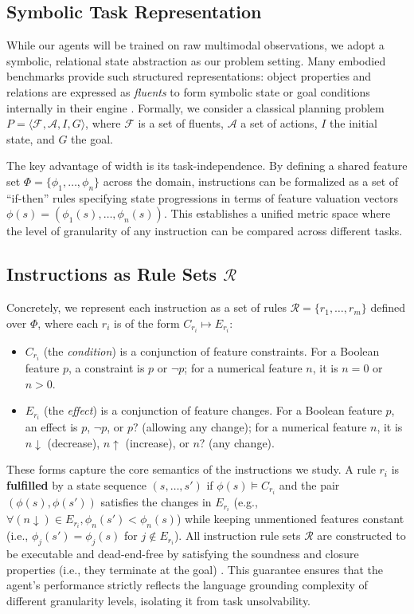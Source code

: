 \documentclass[11pt]{article}
\begin{document}
\subsection{Symbolic Task Representation}

While our agents will be trained on raw multimodal observations, we adopt a symbolic, relational state abstraction as our problem setting. Many embodied benchmarks provide such structured representations: object properties and relations are expressed as \emph{fluents} to form symbolic state or goal conditions internally in their engine \citep{shridhar2020alfred,DBLP:conf/corl/LiHGMPWFLSKL0F024}. Formally, we consider a classical planning problem $P = \langle \mathcal{F}, \mathcal{A}, I, G \rangle$, where $\mathcal{F}$ is a set of fluents, $\mathcal{A}$ a set of actions, $I$ the initial state, and $G$ the goal. 

The key advantage of width is its task-independence. By defining a shared feature set $\Phi = \{\phi_1, \ldots, \phi_n\}$ across the domain, instructions can be formalized as a set of ``if-then'' rules specifying state progressions in terms of feature valuation vectors $\phi(s) = \left(\phi_1(s), \ldots, \phi_n(s)\right)$. This establishes a unified metric space where the level of granularity of any instruction can be compared across different tasks.

\subsection{Instructions as Rule Sets $\mathcal{R}$} %

Concretely, we represent each instruction as a set of rules $\mathcal{R} = \{r_1,\ldots, r_m\}$ defined over $\Phi$, where each $r_i$ is of the form $C_{r_i} \mapsto E_{r_i}$:
\begin{itemize}[leftmargin=*]
    \item $C_{r_i}$ (the \emph{condition}) is a conjunction of feature constraints. For a Boolean feature $p$, a constraint is $p$ or $\lnot p$; for a numerical feature $n$, it is $n = 0$ or $n > 0$.
    \item $E_{r_i}$ (the \emph{effect}) is a conjunction of feature changes. For a Boolean feature $p$, an effect is $p$, $\lnot p$, or $p?$ (allowing any change); for a numerical feature $n$, it is $n\downarrow$ (decrease), $n\uparrow$ (increase), or $n?$ (any change).
\end{itemize}
These forms capture the core semantics of the instructions we study. A rule $r_i$ is \textbf{fulfilled} by a state sequence $(s, \dots, s')$ if $\phi(s) \models C_{r_i}$ and the pair $(\phi(s), \phi(s'))$ satisfies the changes in $E_{r_i}$ (e.g., $\forall (n \downarrow) \in E_{r_i}, \phi_n(s') < \phi_n(s)$) while keeping unmentioned features constant (i.e., $\phi_j(s') = \phi_j(s)$ for $j \notin E_{r_i}$).
All instruction rule sets $\mathcal{R}$ are constructed to be executable and dead-end-free by satisfying the soundness and closure properties (i.e., they terminate at the goal) \citep{DBLP:conf/aaai/BonetG21}. This guarantee ensures that the agent's performance strictly reflects the language grounding complexity of different granularity levels, isolating it from task unsolvability.
\end{document}
